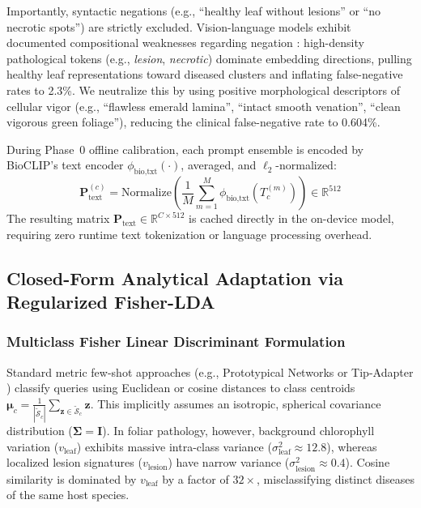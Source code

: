 \documentclass[a4paper,fleqn,nologo]{cas-dc}
\begin{document}
Importantly, syntactic negations (e.g., ``healthy leaf without lesions'' or ``no necrotic spots'') are strictly excluded. Vision-language models exhibit documented compositional weaknesses regarding negation \cite{radford2021clip, yuksekgonul2023when, alhamoud2025vision}: high-density pathological tokens (e.g., \textit{lesion}, \textit{necrotic}) dominate embedding directions, pulling healthy leaf representations toward diseased clusters and inflating false-negative rates to 2.3\%. We neutralize this by using positive morphological descriptors of cellular vigor (e.g., ``flawless emerald lamina'', ``intact smooth venation'', ``clean vigorous green foliage''), reducing the clinical false-negative rate to 0.604\%.

During Phase~0 offline calibration, each prompt ensemble is encoded by BioCLIP's text encoder $\phi_{\text{bio,txt}}(\cdot)$, averaged, and $\ell_2$-normalized:
\begin{equation}
    \mathbf{P}_{\text{text}}^{(c)} = \text{Normalize}\left(\frac{1}{M}\sum_{m=1}^M \phi_{\text{bio,txt}}(T_c^{(m)})\right) \in \mathbb{R}^{512}
\end{equation}
The resulting matrix $\mathbf{P}_{\text{text}} \in \mathbb{R}^{C \times 512}$ is cached directly in the on-device model, requiring zero runtime text tokenization or language processing overhead.

\subsection{Closed-Form Analytical Adaptation via Regularized Fisher-LDA}
\label{sec:fisher_adaptation}

\subsubsection{Multiclass Fisher Linear Discriminant Formulation}
Standard metric few-shot approaches (e.g., Prototypical Networks \cite{snell2017prototypical} or Tip-Adapter \cite{zhang2022tip}) classify queries using Euclidean or cosine distances to class centroids $\boldsymbol{\mu}_c = \frac{1}{|\tilde{\mathcal{S}}_c|}\sum_{\mathbf{z} \in \tilde{\mathcal{S}}_c}\mathbf{z}$. This implicitly assumes an isotropic, spherical covariance distribution ($\mathbf{\Sigma} = \mathbf{I}$). In foliar pathology, however, background chlorophyll variation ($v_{\text{leaf}}$) exhibits massive intra-class variance ($\sigma_{\text{leaf}}^2 \approx 12.8$), whereas localized lesion signatures ($v_{\text{lesion}}$) have narrow variance ($\sigma_{\text{lesion}}^2 \approx 0.4$). Cosine similarity is dominated by $v_{\text{leaf}}$ by a factor of $32\times$, misclassifying distinct diseases of the same host species.
\end{document}
